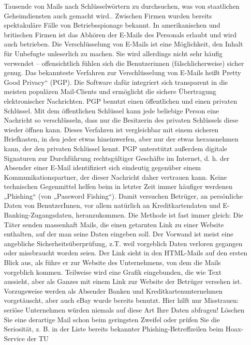 \documentclass[]{book}
\theoremstyle{definition}
\theoremstyle{definition}
\theoremstyle{definition}
\theoremstyle{remark}
\begin{document}
Tausende von Mails nach Schlüsselwörtern zu durchsuchen, was von
staatlichen Geheimdiensten auch gemacht wird.. Zwischen Firmen wurden
bereits spektakuläre Fälle von Betriebsspionage bekannt. In
amerikanischen und britischen Firmen ist das Abhören der E-Mails des
Personals erlaubt und wird auch betrieben. Die Verschlüsselung von
E-Mails ist eine Möglichkeit, den Inhalt für Unbefugte unleserlich zu
machen. Sie wird allerdings nicht sehr häufig verwendet --
offensichtlich fühlen sich die Benutzerinnen (fälschlicherweise) sicher
genug. Das bekannteste Verfahren zur Verschlüsselung von E-Mails heißt
Pretty Good Privacy`` (PGP). Die Software dafür integriert sich
transparent in die meisten populären Mail-Clients und ermöglicht die
sichere Übertragung elektronischer Nachrichten. PGP benutzt einen
öffentlichen und einen privaten Schlüssel. Mit dem öffentlichen
Schlüssel kann jede beliebige Person eine Nachricht so verschlüsseln,
dass nur die Besitzerin des privaten Schlüssels diese wieder öffnen
kann. Dieses Verfahren ist vergleichbar mit einem sicheren Briefkasten,
in den jeder etwas hineinwerfen, aber nur der etwas herausnehmen kann,
der den privaten Schlüssel kennt. PGP unterstützt außerdem digitale
Signaturen zur Durchführung rechtsgültiger Geschäfte im Internet, d. h.
der Absender einer E-Mail identifiziert sich eindeutig gegenüber einem
Kommunikationspartner, der dieser Nachricht daher vertrauen kann. Keine
technischen Gegenmittel helfen beim in letzter Zeit immer häufiger
werdenen „Phishing`` (von „Password Fishing``). Damit versuchen
Betrüger, an persönliche Daten von BenutzerInnen, vor allem natürlich an
Kreditkartendaten und E-Banking-Zugangsdaten, heranzukommen. Die Methode
ist fast immer gleich: Die Täter senden massenhaft Mails, die einen
getarnten Link zu einer Website enthalten, auf der man seine Daten
eingeben soll. Der Vorwand ist meist eine angebliche
Sicherheitsüberprüfung, z.T. weil vorgeblich Daten verloren gegangen
oder missbraucht worden seien. Der Link sieht in den HTML-Mails auf den
ersten Blick aus, als führe er zur Website des Unternehmens, von dem die
Mails vorgeblich kommen. Teilweise wird eine Grafik eingebunden, die wie
Text aussieht, aber als Ganzes mit einem Link zur Website der Betrüger
versehen ist. Vorzugsweise werden als Absender Banken und
Kreditkartenunternehmen vorgetäuscht, aber auch eBay wurde bereits
benutzt. Hier hilft nur Misstrauen: seriöse Unternehmen würden niemals
auf diese Art Ihre Daten abfragen! Löschen Sie eine derartige Mail schon
beim geringsten Zweifel oder prüfen Sie die Seriosität, z. B. in der
Liste bereits bekannter Phishing-Betreffzeilen beim Hoax-Service der TU
\end{document}
